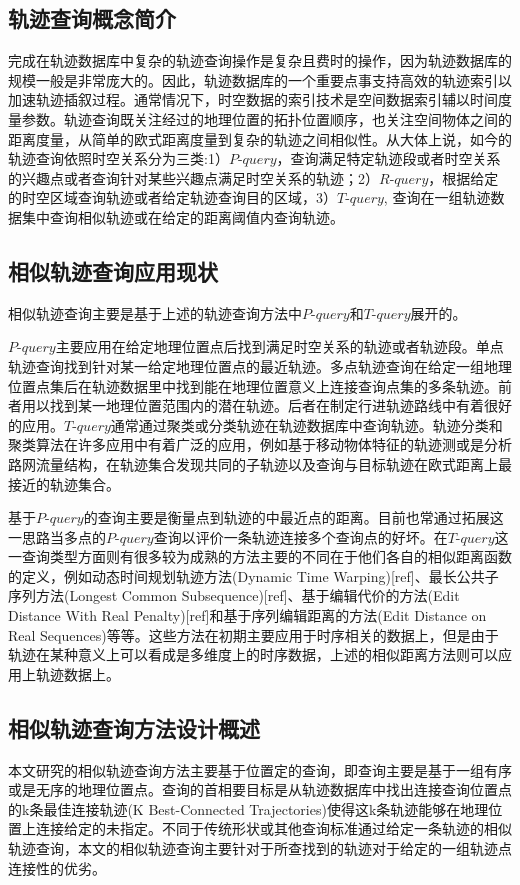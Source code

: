 \subsection{轨迹查询概念简介}
\label{sec:requirements}
完成在轨迹数据库中复杂的轨迹查询操作是复杂且费时的操作，因为轨迹数据库的规模一般是非常庞大的。因此，轨迹数据库的一个重要点事支持高效的轨迹索引以加速轨迹插叙过程。通常情况下，时空数据的索引技术是空间数据索引辅以时间度量参数。轨迹查询既关注经过的地理位置的拓扑位置顺序，也关注空间物体之间的距离度量，从简单的欧式距离度量到复杂的轨迹之间相似性。从大体上说，如今的轨迹查询依照时空关系分为三类:1）$P$-$query$，查询满足特定轨迹段或者时空关系的兴趣点或者查询针对某些兴趣点满足时空关系的轨迹；2）$R$-$query$，根据给定的时空区域查询轨迹或者给定轨迹查询目的区域，3）$T$-$query$, 查询在一组轨迹数据集中查询相似轨迹或在给定的距离阈值内查询轨迹。
\\

\subsection{相似轨迹查询应用现状}
\label{sec:requirements}
相似轨迹查询主要是基于上述的轨迹查询方法中$P$-$query$和$T$-$query$展开的。

$P$-$query$主要应用在给定地理位置点后找到满足时空关系的轨迹或者轨迹段。单点轨迹查询找到针对某一给定地理位置点的最近轨迹。多点轨迹查询在给定一组地理位置点集后在轨迹数据里中找到能在地理位置意义上连接查询点集的多条轨迹。前者用以找到某一地理位置范围内的潜在轨迹。后者在制定行进轨迹路线中有着很好的应用。$T$-$query$通常通过聚类或分类轨迹在轨迹数据库中查询轨迹。轨迹分类和聚类算法在许多应用中有着广泛的应用，例如基于移动物体特征的轨迹测或是分析路网流量结构，在轨迹集合发现共同的子轨迹以及查询与目标轨迹在欧式距离上最接近的轨迹集合。

基于$P$-$query$的查询主要是衡量点到轨迹的中最近点的距离。目前也常通过拓展这一思路当多点的$P$-$query$查询以评价一条轨迹连接多个查询点的好坏。在$T$-$query$这一查询类型方面则有很多较为成熟的方法主要的不同在于他们各自的相似距离函数的定义，例如动态时间规划轨迹方法(Dynamic Time Warping)[ref]、最长公共子序列方法(Longest Common Subsequence)[ref]、基于编辑代价的方法(Edit Distance With Real Penalty)[ref]和基于序列编辑距离的方法(Edit Distance on Real Sequences)等等。这些方法在初期主要应用于时序相关的数据上，但是由于轨迹在某种意义上可以看成是多维度上的时序数据，上述的相似距离方法则可以应用上轨迹数据上。
\\

\subsection{相似轨迹查询方法设计概述}
\label{sec:requirements}
本文研究的相似轨迹查询方法主要基于位置定的查询，即查询主要是基于一组有序或是无序的地理位置点。查询的首相要目标是从轨迹数据库中找出连接查询位置点的k条最佳连接轨迹(K Best-Connected Trajectories)使得这k条轨迹能够在地理位置上连接给定的未指定。不同于传统形状或其他查询标准通过给定一条轨迹的相似轨迹查询，本文的相似轨迹查询主要针对于所查找到的轨迹对于给定的一组轨迹点连接性的优劣。

